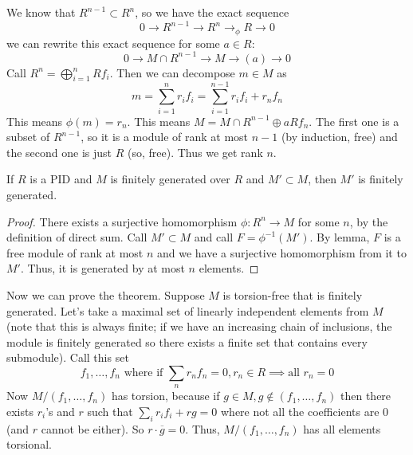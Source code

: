 We know that $R^{n - 1} \subset R^n$, so we have the exact sequence
\[ 0 \to R^{n - 1} \to R^n \to_{\phi} R \to 0 \]
we can rewrite this exact sequence for some $a \in R$:
\[ 0 \to M \cap R^{n - 1} \to M \to (a) \to 0 \]
Call $R^n = \bigoplus_{i = 1}^n R f_i$. Then we can decompose $m \in M$ as
\[ m = \sum_{i = 1}^n r_i f_i = \sum_{i = 1}^{n - 1} r_i f_i + r_n f_n \]
This means $\phi(m) = r_n$. This means $M = M \cap R^{n - 1} \oplus a R f_n$. The first one is a subset of $R^{n - 1}$,
so it is a module of rank at most $n - 1$ (by induction, free) and the second one is just $R$ (so, free). Thus we get rank $n$.
\begin{lemma}
    If $R$ is a PID and $M$ is finitely generated over $R$ and $M' \subset M$, then $M'$ is finitely generated.
    \begin{proof}
        There exists a surjective homomorphism $\phi: R^n \to M$ for some $n$, by the definition of direct sum.
        Call $M' \subset M$ and call $F = \phi^{-1}(M')$. By lemma, $F$ is a free module of rank at most $n$
        and we have a surjective homomorphism from it to $M'$. Thus,
        it is generated by at most $n$ elements.
    \end{proof}
\end{lemma}
Now we can prove the theorem. Suppose $M$ is torsion-free that is finitely generated. Let's take a maximal set of linearly independent elements from $M$
(note that this is always finite; if we have an increasing chain of inclusions, the module is finitely generated
so there exists a finite set that contains every submodule). Call this set
\[ f_1, \dots, f_n \text{ where if }  \sum_n r_n f_n = 0, r_n \in R \implies \text{all } r_n = 0 \]
Now $M/(f_1, \dots, f_n)$ has torsion, because if $g \in M, g \notin (f_1, \dots, f_n)$ then there exists $r_i$'s and $r$ such that
$\sum_i r_i f_i + rg = 0$ where not all the coefficients are $0$ (and $r$ cannot be either). So $r \cdot \overline{g} = 0$. Thus, $M/(f_1, \dots, f_n)$
has all elements torsional.

